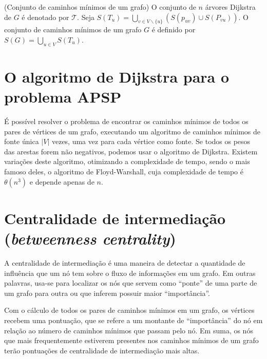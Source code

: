 \begin{definition}
    (Conjunto de caminhos mínimos de um grafo) O conjunto de $n$ árvores Dijkstra de $G$ é denotado por $\mathcal{T}$. Seja $S(T_u) = \bigcup_{v \in V \backslash\{u\}} (S(p_{uv}) \cup S(P_{vu}))$. O conjunto de caminhos mínimos de um grafo $G$ é definido por $S(G) = \bigcup_{u \in V} S(T_u)$.
\end{definition}

\section{O algoritmo de Dijkstra para o problema APSP}
É possível resolver o problema de encontrar os caminhos mínimos de todos os pares de vértices de um grafo, executando um algoritmo de caminhos mínimos de fonte única $|V|$ vezes, uma vez para cada vértice como fonte. Se todos os pesos das arestas forem não negativos, podemos usar o algoritmo de Dijkstra. Existem variações deste algoritmo, otimizando a complexidade de tempo, sendo o mais famoso deles, o algoritmo de Floyd-Warshall, cuja complexidade de tempo é $\theta(n^3)$ e depende apenas de $n$.

\section{Centralidade de intermediação (\emph{betweenness centrality})}
A centralidade de intermediação é uma maneira de detectar a quantidade de influência que um nó tem sobre o fluxo de informações em um grafo. Em outras palavras, usa-se para localizar os nós que servem como ``ponte'' de uma parte de um grafo para outra ou que inferem possuir maior ``importância''.

Com o cálculo de todos os pares de caminhos mínimos em um grafo, os vértices recebem uma pontuação, que se refere a um montante de ``importância'' do nó em relação ao número de caminhos mínimos que passam pelo nó. Em suma, os nós que mais frequentemente estiverem presentes nos caminhos mínimos de um grafo terão pontuações de centralidade de intermediação mais altas.

